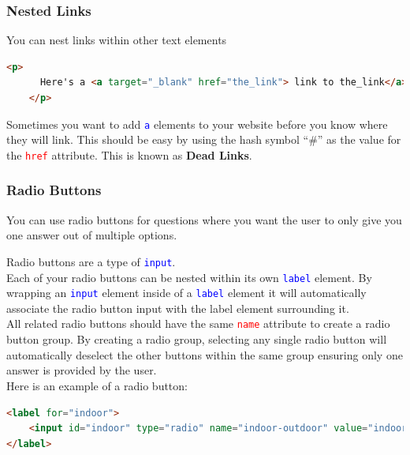 \documentclass{article}
\begin{document}
    \subsubsection{Nested Links}
    
    \noindent You can nest links within other text elements
    
    \begin{lstlisting}[language=html]
    <p>
      Here's a <a target="_blank" href="the_link"> link to the_link</a>.
    </p>
    \end{lstlisting}

    \noindent Sometimes you want to add \textcolor{blue}{{\tt a}} elements to your website before you know where they will link. This should be easy by using the hash symbol ``\#'' as the value for the \textcolor{red}{{\tt href}} attribute. This is known as \textbf{Dead Links}.
    
    \subsubsection{Radio Buttons}
    
    \noindent You can use radio buttons for questions where you want the user to only give you one answer out of multiple options.\par
    
    Radio buttons are a type of \textcolor{blue}{{\tt input}}.\\
    
    Each of your radio buttons can be nested within its own \textcolor{blue}{{\tt label}} element. By wrapping an \textcolor{blue}{{\tt input}} element inside of a \textcolor{blue}{{\tt label}} element it will automatically associate the radio button input with the label element surrounding it.\\
    
    All related radio buttons should have the same \textcolor{red}{{\tt name}} attribute to create a radio button group. By creating a radio group, selecting any single radio button will automatically deselect the other buttons within the same group ensuring only one answer is provided by the user.\\
    
    \noindent Here is an example of a radio button:
    
    \begin{lstlisting}[language=html]
<label for="indoor">
    <input id="indoor" type="radio" name="indoor-outdoor" value="indoor">Indoor
</label>
    \end{lstlisting}
\end{document}
